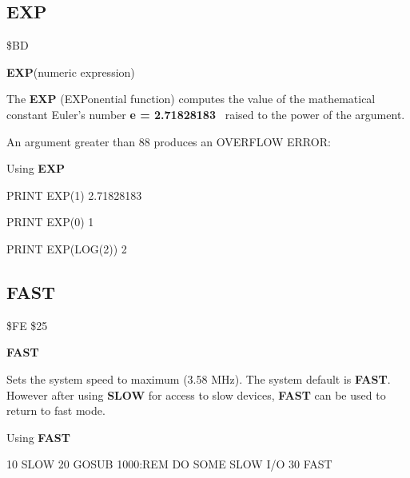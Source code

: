 
\newpage
\subsection{EXP}
\begin{description}[leftmargin=3cm,style=nextline]
\item [Token:] \$BD
\item [Format:] {\bf EXP}(numeric expression)
\item [Usage:] The {\bf EXP} (EXPonential function) computes
               the value of the mathematical constant
               Euler's number {\bf e = 2.71828183}
               raised to the power of the
               argument.

\item [Remarks:] An argument greater than 88 produces
                 an OVERFLOW ERROR:
\item [Example:] Using {\bf EXP}
\begin{screenoutput}
PRINT EXP(1)
 2.71828183

PRINT EXP(0)
 1

PRINT EXP(LOG(2))
 2
\end{screenoutput}
\end{description}


\newpage
\subsection{FAST}
\begin{description}[leftmargin=3cm,style=nextline]
\item [Token:] \$FE \$25
\item [Format:] {\bf FAST}
\item [Usage:] Sets the system speed
               to maximum (3.58 MHz).
               The system default is {\bf FAST}.
               However after using {\bf SLOW} for access to
               slow devices, {\bf FAST} can be used to return
               to fast mode.

\item [Example:] Using {\bf FAST}
\begin{screenoutput}
10 SLOW
20 GOSUB 1000:REM DO SOME SLOW I/O
30 FAST
\end{screenoutput}
\end{description}


